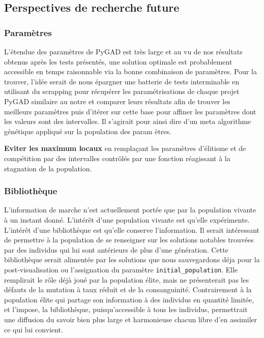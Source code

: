 \documentclass[journal, a4paper]{IEEEtran}
\begin{document}
\subsection{Perspectives de recherche future}\label{subsec:perspectives-de-recherche-future}

\subsubsection{Paramètres}
	L'étendue des paramètres de PyGAD est très large et au vu de nos
	résultats obtenus après les tests présentés,
	une solution
	optimale est probablement accessible en temps raisonnable via
	la bonne combinaison de paramètres.
	Pour la trouver, l'idée serait de nous épargner une batterie de
	tests interminable en
	utilisant du scrapping pour récupérer les paramétrisations de chaque
	projet PyGAD similaire au notre et comparer leurs résultats afin de
	trouver
	les
	meilleurs paramètres puis d'itérer sur cette base pour affiner
	les paramètres dont les valeurs sont des intervalles. Il s'agirait
	pour ainsi dire d'un meta algorithme génétique appliqué sur
	la population des param
	ètres.

	\textbf{Eviter les maximum locaux} en remplaçant les paramètres
	d'élitisme et de compétition par des intervalles contrôlés par une
	fonction réagissant à la stagnation de la population.
\subsubsection{Bibliothèque}
	L'information de marche n'est actuellement portée que par la
	population vivante à un instant donné. L'intérêt d'une population
	vivante est qu'elle expérimente. L'intérêt d'une bibliothèque
	est qu'elle conserve l'information.
	Il serait	intéressant de permettre à la population de se
	renseigner sur les solutions notables trouvées par des individus
	qui lui sont antérieurs de plus d'une génération.
	Cette bibliothèque serait alimentée par les solutions que nous
	sauvegardons
	déja pour la post-visualisation ou l'assignation du paramètre
	\texttt{initial\_population}.
	Elle remplirait le rôle déjà joué par la population élite, mais
	ne présenterait pas les défauts de la mutation à taux réduit et
	de la
	consanguinité.
	Contrairement à la population élite qui partage son information à
	des individus en quantité limitée, et l'impose, la bibliothèque,
	puisqu'accessible à tous les individus, permettrait une diffusion
	du savoir bien plus large et harmonieuse chacun libre d'en
	assimiler
	ce qui lui convient.
\end{document}
